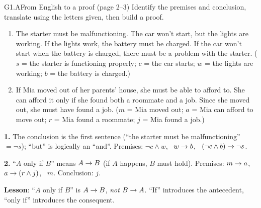 \begin{nbexercise}{G1.A}{From English to a proof (page 2--3)}
Identify the premises and conclusion, translate using the letters given, then build a
proof.
\begin{enumerate}[nosep]
  \item The starter must be malfunctioning. The car won't start, but the lights are
        working. If the lights work, the battery must be charged. If the car won't start
        when the battery is charged, there must be a problem with the starter.
        ($s$ = the starter is functioning properly; $c$ = the car starts; $w$ = the lights
        are working; $b$ = the battery is charged.)
  \item If Mia moved out of her parents' house, she must be able to afford to. She can
        afford it only if she found both a roommate and a job. Since she moved out, she
        must have found a job. ($m$ = Mia moved out; $a$ = Mia can afford to move out;
        $r$ = Mia found a roommate; $j$ = Mia found a job.)
\end{enumerate}
\end{nbexercise}
\begin{nbsolution}
\textbf{1.} The conclusion is the first sentence (``the starter must be malfunctioning'' $=
\neg s$); ``but'' is logically an ``and''. Premises: $\neg c \land w$, \ $w \rightarrow b$, \
$(\neg c \land b) \rightarrow \neg s$.
\begin{fitchproof}
 \RPrem
{} \RPrem
{} \RPrem
{} 
 \RAndE{1}
 
 
 
\end{fitchproof}
\textbf{2.} ``$A$ only if $B$'' means $A \rightarrow B$ (if $A$ happens, $B$ must hold). Premises:
$m \rightarrow a$, \ $a \rightarrow (r \land j)$, \ $m$. Conclusion: $j$.
\begin{fitchproof}
 \RPrem
{} \RPrem
{} \RPrem
{} 
 
 
\end{fitchproof}
\textbf{Lesson}: ``$A$ only if $B$'' is $A \rightarrow B$, \emph{not} $B \rightarrow A$. ``If'' introduces
the antecedent, ``only if'' introduces the consequent.
\end{nbsolution}

